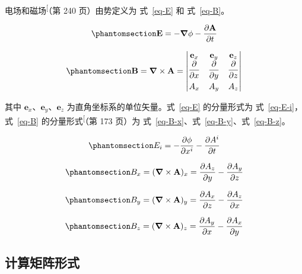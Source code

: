 \documentclass[
  chinese,
  a4paper,
  UTF8,
  12pt,
  oneside,
  openany]{ctexbook}
\theoremstyle{plain}
\theoremstyle{plain}
\theoremstyle{plain}
\theoremstyle{definition}
\theoremstyle{plain}
\theoremstyle{plain}
\theoremstyle{remark}
\begin{document}
电场和磁场\textsuperscript{{[}\citeproc{ref-feynman2020vol2}{6}{]}}（第
240 页）由势定义为 式~\ref{eq-E} 和 式~\ref{eq-B}。

\begin{equation}\protect\phantomsection\label{eq-E}{\mathbf{E} = - \boldsymbol{\nabla}\phi - \frac{\partial\mathbf{A}}{\partial t}}\end{equation}

\begin{equation}\protect\phantomsection\label{eq-B}{
\mathbf{B} = \boldsymbol{\nabla} \times \mathbf{A} =
\begin{vmatrix}
\mathbf{e}_x & \mathbf{e}_y & \mathbf{e}_z \\
\dfrac{\partial}{\partial x} & \dfrac{\partial}{\partial y} & \dfrac{\partial}{\partial z} \\[8pt]
A_x & A_y & A_z
\end{vmatrix}
}\end{equation}

其中 \(\mathbf{e}_x\)、\(\mathbf{e}_y\)、\(\mathbf{e}_z\)
为直角坐标系的单位矢量。式~\ref{eq-E} 的分量形式为
式~\ref{eq-E-i}，式~\ref{eq-B}
的分量形式\textsuperscript{{[}\citeproc{ref-feynman2020vol2}{6}{]}}（第
173 页）为 式~\ref{eq-B-x}、式~\ref{eq-B-y}、式~\ref{eq-B-z}。

\begin{equation}\protect\phantomsection\label{eq-E-i}{ E_{i} = - \frac{\partial\phi}{\partial x^{i}} - \frac{\partial A^i}{\partial t}}\end{equation}

\begin{equation}\protect\phantomsection\label{eq-B-x}{
B_x = (\boldsymbol{\nabla} \times \mathbf{A})_x = \frac{\partial A_z}{\partial y} - \frac{\partial A_y}{\partial z}
}\end{equation}

\begin{equation}\protect\phantomsection\label{eq-B-y}{
B_y = (\boldsymbol{\nabla} \times \mathbf{A})_y = \frac{\partial A_x}{\partial z} - \frac{\partial A_z}{\partial x}
}\end{equation}

\begin{equation}\protect\phantomsection\label{eq-B-z}{
B_z = (\boldsymbol{\nabla} \times \mathbf{A})_z = \frac{\partial A_y}{\partial x} - \frac{\partial A_x}{\partial y}
}\end{equation}

\subsection{计算矩阵形式}\label{ux8ba1ux7b97ux77e9ux9635ux5f62ux5f0f}
\end{document}

